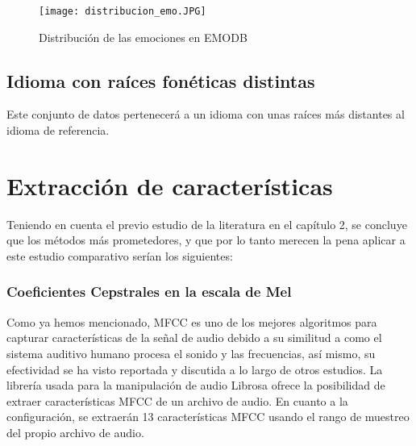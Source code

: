 \documentclass[11pt,a4paper,spanish]{book}
\begin{document}
	\begin{figure}[H]
		\centering
		\texttt{[image: distribucion\_emo.JPG]} 
		\caption{Distribución de las emociones en EMODB}
		\label{fig:emociones_emodb}
	\end{figure}
	


	
	\subsection{Idioma con raíces fonéticas distintas} Este conjunto de datos pertenecerá a un idioma con unas raíces más distantes al idioma de referencia.\\
	
	
	\section{Extracción de características}
	\label{sec:extraccion_cap4}
	Teniendo en cuenta el previo estudio de la literatura en el capítulo 2, se concluye que los métodos más prometedores, y que por lo tanto merecen la pena aplicar a este estudio comparativo serían los siguientes:
	\subsubsection{Coeficientes Cepstrales en la escala de Mel}
	Como ya hemos mencionado, MFCC es uno de los mejores algoritmos para capturar características de la señal de audio debido a su similitud a como el sistema auditivo humano procesa el sonido y las frecuencias, así mismo, su efectividad se ha visto reportada y discutida a lo largo de otros estudios.
	La librería usada para la manipulación de audio Librosa ofrece la posibilidad de extraer características MFCC de un archivo de audio. En cuanto a la configuración, se extraerán 13 características MFCC usando el rango de muestreo del propio archivo de audio.
	

	
\end{document}
